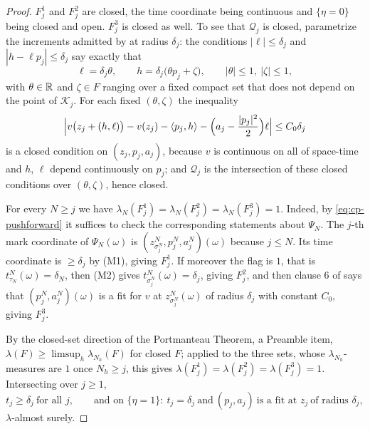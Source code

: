 \begin{proof}
$F^1_j$ and $F^2_j$ are closed, the time coordinate being continuous and
$\{\eta=0\}$ being closed and open. $F^3_j$ is closed as well. To see that
$\mathcal Q_j$ is closed, parametrize the increments admitted by  at
radius $\delta_j$: the conditions $|\ell|\le\delta_j$ and
$|h-\ell p_j|\le\delta_j$ say exactly that
\[
  \ell=\delta_j\theta,\qquad h=\delta_j\bigl(\theta p_j+\zeta\bigr),
  \qquad |\theta|\le1,\ |\zeta|\le1 ,
\]
with $\theta\in\mathbb{R}$ and $\zeta\in F$ ranging over a fixed compact set that does
not depend on the point of $\mathcal K_j$. For each fixed $(\theta,\zeta)$ the
inequality
\[
  \Bigl|v\bigl(z_j+(h,\ell)\bigr)-v(z_j)-\langle p_j,h\rangle
     -\Bigl(a_j-\frac{|p_j|^2}{2}\Bigr)\ell\Bigr|\le C_0\delta_j
\]
is a closed condition on $(z_j,p_j,a_j)$, because $v$ is continuous on all of
space-time and $h$, $\ell$ depend continuously on $p_j$; and $\mathcal Q_j$ is the
intersection of these closed conditions over $(\theta,\zeta)$, hence closed.

For every $N\ge j$ we have
$\lambda_N(F^1_j)=\lambda_N(F^2_j)=\lambda_N(F^3_j)=1$. Indeed, by
\eqref{eq:cp-pushforward} it suffices to check the corresponding statements
about $\Psi_N$. The $j$-th mark coordinate of $\Psi_N(\omega)$ is
$(z^N_{\sigma^N_j},p^N_j,a^N_j)(\omega)$ because $j\le N$. Its time coordinate
is $\ge\delta_j$ by (M1), giving $F^1_j$. If moreover the flag is $1$, that is
$t^N_{\tau_N}(\omega)=\delta_N$, then (M2) gives
$t^N_{\sigma^N_j}(\omega)=\delta_j$, giving $F^2_j$, and then clause 6 of
 says that $(p^N_j,a^N_j)(\omega)$ is a fit for $v$ at
$z^N_{\sigma^N_j}(\omega)$ of radius $\delta_j$ with constant $C_0$, giving
$F^3_j$.

By the closed-set direction of the Portmanteau Theorem, a Preamble item,
$\lambda(F)\ge\limsup_h\lambda_{N_h}(F)$ for closed $F$; applied to the three
sets, whose $\lambda_{N_h}$-measures are $1$ once $N_h\ge j$, this gives
$\lambda(F^1_j)=\lambda(F^2_j)=\lambda(F^3_j)=1$. Intersecting over $j\ge1$,
\begin{equation}\label{eq:cp-mark-limit}
  t_j\ge\delta_j\ \text{for all }j,\qquad
  \text{and on }\{\eta=1\}:\ t_j=\delta_j\ \text{and}\
  (p_j,a_j)\ \text{is a fit at }z_j\ \text{of radius }\delta_j,
\end{equation}
$\lambda$-almost surely.


\end{proof}
